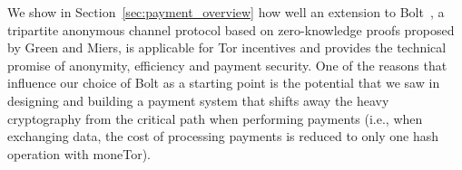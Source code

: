 We show in Section~\ref{sec:payment_overview} how well an extension to Bolt~\cite{green2017bolt}, a tripartite anonymous channel protocol based on zero-knowledge proofs proposed by Green and Miers, is applicable for Tor incentives and provides the technical promise of anonymity, efficiency and payment security.  
One of the reasons that influence our choice of Bolt as a starting point is the potential that we saw in designing and building a payment system that shifts away the heavy cryptography from the critical path when performing payments (i.e., when exchanging data, the cost of processing payments is reduced to only one hash operation with moneTor).


